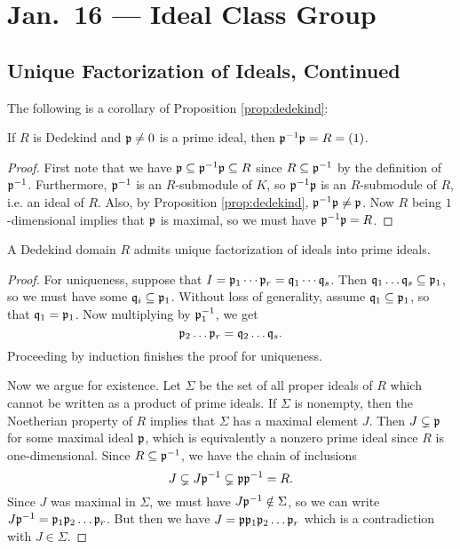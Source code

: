 \chapter{Jan.~16 --- Ideal Class Group}

\section{Unique Factorization of Ideals, Continued}
The following is a corollary of Proposition
\ref{prop:dedekind}:

\begin{corollary}
  If $R$ is Dedekind and
  $\mathfrak{p} \ne 0$ is a prime ideal, then
  $\mathfrak{p}^{-1} \mathfrak{p} = R = (1)$.
\end{corollary}

\begin{proof}
  First note that we have $\mathfrak{p} \subseteq \mathfrak{p}^{-1} \mathfrak{p} \subseteq R$
  since $R \subseteq \mathfrak{p}^{-1}$ by the definition
  of $\mathfrak{p}^{-1}$. Furthermore, $\mathfrak{p}^{-1}$ is an
  $R$-submodule of $K$, so $\mathfrak{p}^{-1} \mathfrak{p}$ is an
  $R$-submodule of $R$, i.e. an ideal of $R$. Also,
  by Proposition \ref{prop:dedekind},
  $\mathfrak{p}^{-1} \mathfrak{p} \ne \mathfrak{p}$. Now $R$ being $1$-dimensional
  implies that $\mathfrak{p}$ is maximal, so we must have
  $\mathfrak{p}^{-1} \mathfrak{p} = R$.
\end{proof}

\begin{prop}
  A Dedekind domain $R$ admits unique factorization
  of ideals into prime ideals.
\end{prop}

\begin{proof}
  For uniqueness, suppose that
  $I = \mathfrak{p}_1 \cdots \mathfrak{p}_r = \mathfrak{q}_1 \cdots \mathfrak{q}_s$.
  Then $\mathfrak{q}_1 \dots \mathfrak{q}_s \subseteq \mathfrak{p}_1$, so we must
  have some $\mathfrak{q}_i \subseteq \mathfrak{p}_1$. Without loss
  of generality, assume $\mathfrak{q}_1 \subseteq \mathfrak{p}_1$, so
  that $\mathfrak{q}_1 = \mathfrak{p}_1$. Now multiplying by
  $\mathfrak{p}_1^{-1}$, we get
  \[
    \mathfrak{p}_2 \dots \mathfrak{p}_r = \mathfrak{q}_2 \dots \mathfrak{q}_s.
  \]
  Proceeding by induction finishes the proof for
  uniqueness.

  Now we argue for existence. Let $\Sigma$ be the set
  of all proper ideals of $R$ which cannot be written
  as a product of prime ideals. If $\Sigma$ is
  nonempty, then the Noetherian property of $R$ implies
  that $\Sigma$ has a maximal element $J$. Then
  $J \subsetneq \mathfrak{p}$ for some maximal ideal $\mathfrak{p}$, which
  is equivalently a nonzero prime ideal since
  $R$ is one-dimensional. Since
  $R \subseteq \mathfrak{p}^{-1}$, we have the chain of inclusions
  \[
    J \subsetneq J \mathfrak{p}^{-1} \subsetneq \mathfrak{p} \mathfrak{p}^{-1} = R.
  \]
  Since $J$ was maximal in $\Sigma$, we must have
  $J \mathfrak{p}^{-1} \notin \Sigma$, so we can write
  $J \mathfrak{p}^{-1} = \mathfrak{p}_1 \mathfrak{p}_2 \dots \mathfrak{p}_r$.
  But then we have $J = \mathfrak{p} \mathfrak{p}_1 \mathfrak{p}_2 \dots \mathfrak{p}_r$
  which is a contradiction with $J \in \Sigma$.
\end{proof}

